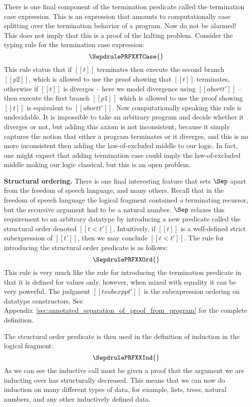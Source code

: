 There is one final component of the termination predicate called the
termination case expression.  This is an expression that amounts to
computationally case splitting over the termination behavior of a
program.  Now do not be alarmed!  This does not imply that this is a
proof of the halting problem.  Consider the typing rule for the
termination case expression: \[ \SepdrulePRFXXTCase{} \] This rule
status that if $[[t]]$ terminates then execute the second branch
$[[p2]]$, which is allowed to use the proof showing that $[[t]]$
terminates, otherwise if $[[t]]$ is diverges -- here we model
divergence using $[[abort t']]$ -- then execute the first branch
$[[p1]]$ which is allowed to use the proof showing $[[t]]$ is
equivalent to $[[abort t']]$.  Now computationally speaking this rule
is undecidable.  It is impossible to take an arbitrary program and
decide whether it diverges or not, but adding this axiom is not
inconsistent, because it simply captures the notion that either a
program terminates or it diverges, and this is no more inconsistent
then adding the law-of-excluded middle to our logic.  In fact, one
might expect that adding termination case could imply the
law-of-excluded middle making our logic classical, but this is an open
problem.

\textbf{Structural ordering.}  There is one final interesting feature
that sets $\Sep$ apart from the freedom of speech language, and many
others.  Recall that in the freedom of speech language the logical
fragment contained a terminating recursor, but the recursive argument
had to be a natural number.  $\Sep$ relaxes this requirement to an
arbitrary datatype by introducing a new predicate called the
structural order denoted $[[t < t']]$.  Intuitively, if $[[t]]$ is a
well-defined strict subexpression of $[[t']]$, then we may conclude
$[[t < t']]$.  The rule for introducing the structural order predicate
is as follows: \[ \SepdrulePRFXXOrd{} \] This rule is very much like
the rule for introducing the termination predicate in that it is
defined for values only, however, when mixed with equality it can be
very powerful.  The judgment $[[t subexpp t']]$ is the subexpression
ordering on datatype constructors.  See
Appendix~\ref{sec:annotated_separation_of_proof_from_program} for the
complete definition.  

The structural order predicate is then used in the definition of
induction in the logical fragment: \[ \SepdrulePRFXXInd{} \] As we can
see the inductive call must be given a proof that the argument we are
inducting over has structurally decreased.  This means that we can now
do induction on many different types of data, for example, lists,
trees, natural numbers, and any other inductively defined data.

